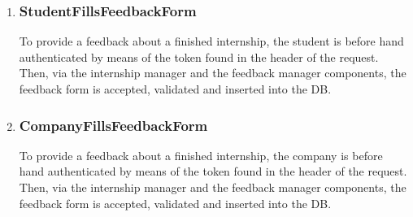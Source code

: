 \begin{enumerate}[label=\textbf{RV\arabic* -}]
\item \subsubsection{StudentFillsFeedbackForm}

To provide a feedback about a finished internship, the student is before hand authenticated by means of the token found in the header of the request.
Then, via the internship manager and the feedback manager components, the feedback form is accepted, validated and inserted into the DB.

\begin{figure}[H]
    \centering
\end{figure}

\item \subsubsection{CompanyFillsFeedbackForm}

To provide a feedback about a finished internship, the company is before hand authenticated by means of the token found in the header of the request.
Then, via the internship manager and the feedback manager components, the feedback form is accepted, validated and inserted into the DB.

\begin{figure}[H]
    \centering
\end{figure}

\end{enumerate}

